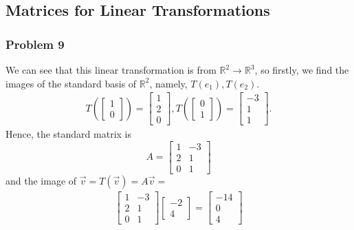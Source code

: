 \documentclass[a4paper,12pt]{article}
\begin{document}
\subsection{Matrices for Linear Transformations}
\subsubsection*{Problem 9}
We can see that this linear transformation is from $\mathbb{R}^2 \to \mathbb{R}^3$, so firstly, we find the images of the standard basis of $\mathbb{R}^2$, namely, $T(e_1),T(e_2).$
\begin{align*}
    T\left(
        \begin{bmatrix}
            1\\
            0
        \end{bmatrix}
    \right)= \begin{bmatrix}
        1\\
        2\\
        0
    \end{bmatrix}, T\left(
        \begin{bmatrix}
            0\\
            1
        \end{bmatrix}
    \right)= \begin{bmatrix}
        -3\\
        1\\
        1
    \end{bmatrix}.
\end{align*}
Hence, the standard matrix is  
\[A=\begin{bmatrix}
    1&-3\\
    2&1\\
    0&1
\end{bmatrix}\]
and the image of $\vec{v}=T(\vec{v})=A\vec{v}=$
\begin{align*}
    \begin{bmatrix}
    1&-3\\
    2&1\\
    0&1
\end{bmatrix} \begin{bmatrix}
    -2\\
    4
\end{bmatrix} = \begin{bmatrix}
    -14\\
    0\\
    4
\end{bmatrix}
\end{align*}
\end{document}
